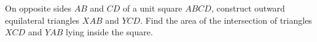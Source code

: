 On opposite sides $AB$ and $CD$ of a unit square $ABCD$, construct outward equilateral triangles $XAB$ and $YCD$. Find the area of the intersection of triangles $XCD$ and $YAB$ lying inside the square.
